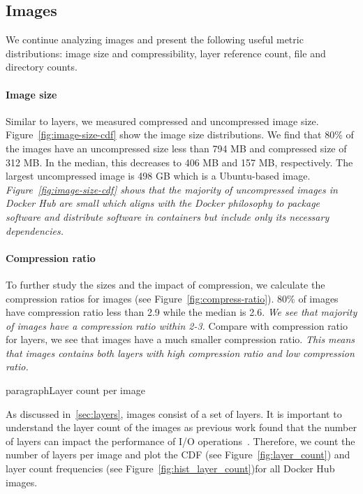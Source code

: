 \subsection{Images}
\label{sec:images}

We continue analyzing images and present the following useful metric
distributions: image size and compressibility, layer reference count, file and
directory counts.

\paragraph{Image size}%

Similar to layers, we measured compressed and uncompressed image size.
%
Figure~\ref{fig:image-size-cdf} show the image size distributions.
%
%
We find that 80\% of the images have an uncompressed size less than 794 MB and
compressed size of 312 MB.
%
In the median, this decreases to 406 MB and 157 MB, respectively.
%
The largest uncompressed image is 498 GB which is a Ubuntu-based image.
%
\emph{Figure~\ref{fig:image-size-cdf} shows that the majority of uncompressed
images in Docker Hub are small which aligns with the Docker philosophy to
package software and distribute software in containers but include only its
necessary dependencies.}

\paragraph{Compression ratio}

To further study the sizes and the impact of compression, we calculate the
compression ratios for images (see Figure~\ref{fig:compress-ratio}).
%
80\% of images have compression ratio less than 2.9 while the median is 2.6.
%
\textit{We see that majority of images have a compression ratio within 2-3.}
Compare with compression ratio for layers, we see that images have a much
smaller compression ratio. 
%
\textit{This means that images contains both layers with high compression ratio
and low compression ratio.}

paragraph{Layer count per image}



As discussed in~\ref{sec:layers}, images consist of a set of layers.
%
It is important to understand the layer count of the images as previous work
found that the number of layers can impact the performance of I/O
operations~\cite{slacker}.
%
Therefore, we count the number of layers per image and plot the CDF (see
Figure~\ref{fig:layer_count}) and layer count frequencies (see
Figure~\ref{fig:hist_layer_count})for all Docker Hub images.

